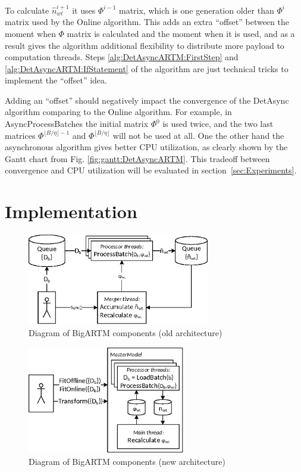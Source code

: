 \documentclass[russian,english]{llncs}
\newcommand{\kw}[1]{\mbox{\textsf{#1}}}
\begin{document}
To calculate $\hat n^{i+1}_{wt}$ it uses $\Phi^{i-1}$ matrix,
which is one generation older than $\Phi^{i}$ matrix used by the \kw{Online} algorithm.
This adds an extra ``offset'' between the moment when $\Phi$ matrix is calculated and the moment when it is used,
and as a result gives the algorithm additional flexibility to distribute more payload to computation threads.
Steps \ref{alg:DetAsyncARTM:FirstStep} and \ref{alg:DetAsyncARTM:IfStatement} of the algorithm
are just technical tricks to implement the ``offset'' idea.

Adding an ``offset'' should negatively impact the convergence of the \kw{DetAsync} algorithm
comparing to the \kw{Online} algorithm.
For example, in \kw{AsyncProcessBatches} the initial matrix $\Phi^0$ is used twice,
and the two last matrices $\Phi^{\lfloor B / \eta \rfloor - 1}$ and $\Phi^{\lfloor B / \eta \rfloor}$ will not be used at all.
One the other hand the asynchronous algorithm gives better CPU utilization,
as clearly shown by the Gantt chart from Fig. \ref{fig:gantt:DetAsyncARTM}.
This tradeoff between convergence and CPU utilization will be evaluated in section~\ref{sec:Experiments}.

\section{Implementation}
\label{sec:Architecture}

\begin{figure}[t]
	\begin{centering}
		\includegraphics[height=40mm]{diagramm_artm_core.eps}
		\caption{Diagram of BigARTM components (old architecture)}
		\label{fig:diagramm_artm_core}
	\end{centering}
\end{figure}
\begin{figure}[t]
	\begin{centering}
		\includegraphics[height=47mm]{diagramm_artm_core_v07.eps}
		\caption{Diagram of BigARTM components (new architecture)}
		\label{fig:diagramm_artm_core_v07}
	\end{centering}
\end{figure}
\end{document}
